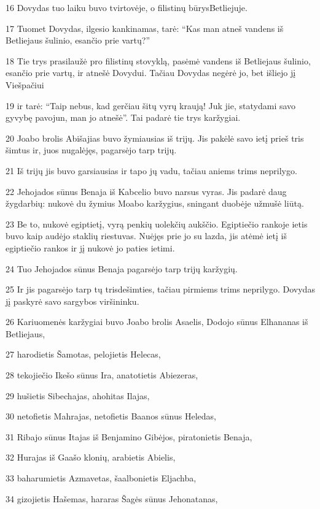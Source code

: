 \par 16 Dovydas tuo laiku buvo tvirtovėje, o filistinų būrys­Betliejuje. 
\par 17 Tuomet Dovydas, ilgesio kankinamas, tarė: “Kas man atneš vandens iš Betliejaus šulinio, esančio prie vartų?” 
\par 18 Tie trys prasilaužė pro filistinų stovyklą, pasėmė vandens iš Betliejaus šulinio, esančio prie vartų, ir atnešė Dovydui. Tačiau Dovydas negėrė jo, bet išliejo jį Viešpačiui 
\par 19 ir tarė: “Taip nebus, kad gerčiau šitų vyrų kraują! Juk jie, statydami savo gyvybę pavojun, man jo atnešė”. Tai padarė tie trys karžygiai. 
\par 20 Joabo brolis Abišajias buvo žymiausias iš trijų. Jis pakėlė savo ietį prieš tris šimtus ir, juos nugalėjęs, pagarsėjo tarp trijų. 
\par 21 Iš trijų jis buvo garsiausias ir tapo jų vadu, tačiau aniems trims neprilygo. 
\par 22 Jehojados sūnus Benaja iš Kabcelio buvo narsus vyras. Jis padarė daug žygdarbių: nukovė du žymius Moabo karžygius, sningant duobėje užmušė liūtą. 
\par 23 Be to, nukovė egiptietį, vyrą penkių uolekčių aukščio. Egiptiečio rankoje ietis buvo kaip audėjo staklių riestuvas. Nuėjęs prie jo su lazda, jis atėmė ietį iš egiptiečio rankos ir jį nukovė jo paties ietimi. 
\par 24 Tuo Jehojados sūnus Benaja pagarsėjo tarp trijų karžygių. 
\par 25 Ir jis pagarsėjo tarp tų trisdešimties, tačiau pirmiems trims neprilygo. Dovydas jį paskyrė savo sargybos viršininku. 
\par 26 Kariuomenės karžygiai buvo Joabo brolis Asaelis, Dodojo sūnus Elhananas iš Betliejaus, 
\par 27 harodietis Šamotas, pelojietis Helecas, 
\par 28 tekojiečio Ikešo sūnus Ira, anatotietis Abiezeras, 
\par 29 hušietis Sibechajas, ahohitas Ilajas, 
\par 30 netofietis Mahrajas, netofietis Baanos sūnus Heledas, 
\par 31 Ribajo sūnus Itajas iš Benjamino Gibėjos, piratonietis Benaja, 
\par 32 Hurajas iš Gaašo klonių, arabietis Abielis, 
\par 33 baharumietis Azmavetas, šaalbonietis Eljachba, 
\par 34 gizojietis Hašemas, hararas Šagės sūnus Jehonatanas, 
